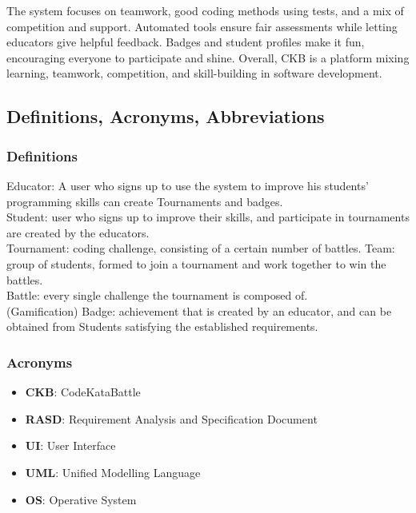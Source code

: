 \documentclass{article}
\begin{document}
The system focuses on teamwork, good coding methods using tests, and a mix of competition and support. Automated tools ensure fair assessments while letting educators give helpful feedback. Badges and student profiles make it fun, encouraging everyone to participate and shine. Overall, CKB is a platform mixing learning, teamwork, competition, and skill-building in software development.

\subsection{Definitions, Acronyms, Abbreviations}
\subsubsection{Definitions}
Educator: A user who signs up to use the system to improve his students' programming skills can create Tournaments and badges. \\
Student: user who signs up to improve their skills, and participate in tournaments are created by the educators.\\
Tournament: coding challenge, consisting of a certain number of battles. Team: group of students, formed to join a tournament and work together to win the battles. \\
Battle: every single challenge the tournament is composed of. \\
(Gamification) Badge: achievement that is created by an educator, and can be obtained from Students satisfying the established requirements.\\

\subsubsection{Acronyms}
\begin{itemize}
    \item \textbf{CKB}: CodeKataBattle
    \item \textbf{RASD}: Requirement Analysis and Specification Document
    \item \textbf{UI}: User Interface
    \item \textbf{UML}: Unified Modelling Language
    \item \textbf{OS}: Operative System
\end{itemize}
\end{document}
